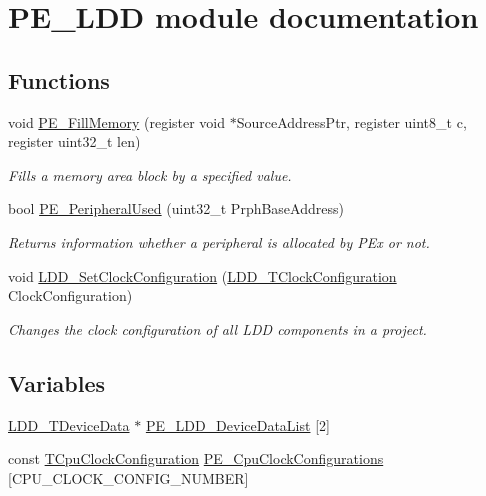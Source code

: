 \hypertarget{group___p_e___l_d_d__module}{}\section{P\+E\+\_\+\+L\+DD module documentation}
\label{group___p_e___l_d_d__module}
\subsection*{Functions}
\begin{DoxyCompactItemize}
\item 
void \hyperlink{group___p_e___l_d_d__module_ga6cb22864b71fd00f200c9fb3375f4e29}{P\+E\+\_\+\+Fill\+Memory} (register void $\ast$Source\+Address\+Ptr, register uint8\+\_\+t c, register uint32\+\_\+t len)
\begin{DoxyCompactList}\small\item\em Fills a memory area block by a specified value. \end{DoxyCompactList}\item 
bool \hyperlink{group___p_e___l_d_d__module_ga9e049b01a45212fe5b6a8476fe124b59}{P\+E\+\_\+\+Peripheral\+Used} (uint32\+\_\+t Prph\+Base\+Address)
\begin{DoxyCompactList}\small\item\em Returns information whether a peripheral is allocated by P\+Ex or not. \end{DoxyCompactList}\item 
void \hyperlink{group___p_e___l_d_d__module_ga7fe8a131453ba765c5e85130a282eafb}{L\+D\+D\+\_\+\+Set\+Clock\+Configuration} (\hyperlink{group___p_e___types__module_ga369bcaf7f00caad5f994c72ac2629a37}{L\+D\+D\+\_\+\+T\+Clock\+Configuration} Clock\+Configuration)
\begin{DoxyCompactList}\small\item\em Changes the clock configuration of all L\+DD components in a project. \end{DoxyCompactList}\end{DoxyCompactItemize}
\subsection*{Variables}
\begin{DoxyCompactItemize}
\item 
\hyperlink{group___p_e___types__module_gac5cf1362f1f0e3a2ce71b1bf2276d091}{L\+D\+D\+\_\+\+T\+Device\+Data} $\ast$ \hyperlink{group___p_e___l_d_d__module_gaaf8ebb1e57f3e6dad9f221a8b30f38dd}{P\+E\+\_\+\+L\+D\+D\+\_\+\+Device\+Data\+List} \mbox{[}2\mbox{]}
\item 
const \hyperlink{struct_t_cpu_clock_configuration}{T\+Cpu\+Clock\+Configuration} \hyperlink{group___p_e___l_d_d__module_gab69281f0e90d16198a5595ed7f471441}{P\+E\+\_\+\+Cpu\+Clock\+Configurations} \mbox{[}C\+P\+U\+\_\+\+C\+L\+O\+C\+K\+\_\+\+C\+O\+N\+F\+I\+G\+\_\+\+N\+U\+M\+B\+ER\mbox{]}
\end{DoxyCompactItemize}


